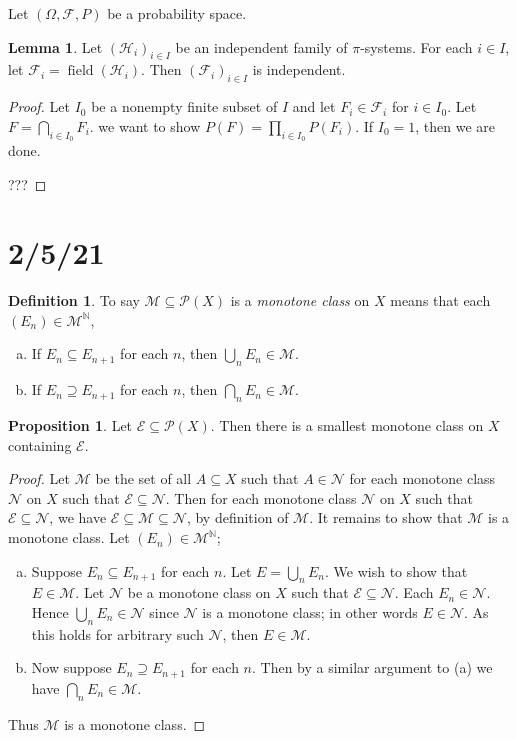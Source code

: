 \documentclass{article}
\DeclareMathOperator{\field}{field}
\newcommand{\N}{\mathbb{N}}
\newcommand{\F}{\mathscr{F}}
\theoremstyle{definition}
\newtheorem{lemma}[theorem]{Lemma}
\newtheorem{proposition}[theorem]{Proposition}
\newtheorem*{definition}{Definition}
\begin{document}
Let $(\Omega, \F, P)$ be a probability space.
\begin{lemma}
Let $(\mathscr{H}_i)_{i \in I}$ be an independent family of $\pi$-systems. For each $i \in I$, let $\F_i = \field(\mathscr{H}_i)$. Then $(\F_i)_{i \in I}$ is independent.
\end{lemma}
\begin{proof}
    Let $I_0$ be a nonempty finite subset of $I$ and let $F_i \in \F_i$ for $i \in I_0$.
    Let $F = \bigcap_{i \in I_0} F_i$. we want to show $P(F) = \prod_{i\in I_0} P(F_i)$.
    If $I_0 = 1$, then we are done.
    
    ???
\end{proof}

\section*{2/5/21}
\begin{definition}
    To say $\mathscr{M} \subseteq \mathcal{P}(X)$ is a \emph{monotone class} on $X$ means that each $(E_n) \in \mathscr{M}^{\N}$,
    \begin{enumerate}[(a)]
        \item If $E_n \subseteq E_{n+1}$ for each $n$, then $\bigcup_n E_n \in \mathscr{M}$.
        \item If $E_n \supseteq E_{n+1}$ for each $n$, then $\bigcap_n E_n \in \mathscr{M}$.
    \end{enumerate}
\end{definition}

\begin{proposition}
    Let $\mathscr{E} \subseteq \mathcal{P}(X)$. Then there is a smallest monotone class on $X$ containing $\mathscr{E}$.
    \begin{proof}
        Let $\mathscr{M}$ be the set of all $A \subseteq X$ such that $A \in \mathscr{N}$ for each monotone class $\mathscr{N}$ on $X$ such that $\mathscr{E} \subseteq \mathscr{N}$.
        Then for each monotone class $\mathscr{N}$ on $X$ such that $\mathscr{E} \subseteq \mathscr{N}$, we have $\mathscr{E} \subseteq \mathscr{M} \subseteq \mathscr{N}$, by definition of $\mathscr{M}$.
        It remains to show that $\mathscr{M}$ is a monotone class. Let $(E_n) \in \mathscr{M}^{\N}$;
        
        \begin{enumerate}[(a)]
            \item  Suppose $E_n \subseteq E_{n+1}$ for each $n$. Let $E = \bigcup_n E_n$. We wish to show that $E \in \mathscr{M}$. Let $\mathscr{N}$ be a monotone class on $X$ such that $\mathscr{E} \subseteq \mathscr{N}$. Each $E_n \in \mathscr{N}$. Hence $\bigcup_n E_n \in \mathscr{N}$ since $\mathscr{N}$ is a monotone class; in other words $E \in \mathscr{N}$. As this holds for arbitrary such $\mathscr{N}$, then $E \in \mathscr{M}$.
            \item Now suppose $E_n \supseteq E_{n+1}$ for each $n$. Then by a similar argument to (a) we have $\bigcap_n E_n \in \mathscr{M}$.
        \end{enumerate}
        Thus $\mathscr{M}$ is a monotone class.
    \end{proof}
\end{proposition}
\end{document}
